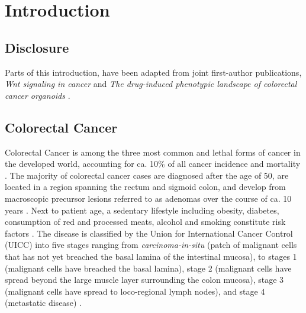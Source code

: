 \chapter{Introduction}
\label{introduction}
\begin{flushleft}
\setlength{\parindent}{7ex}
\section{Disclosure}
Parts of this introduction, have been adapted from joint first-author publications, \textit{Wnt signaling in cancer} \citep{zhanWntSignalingCancer2017} and \textit{The drug-induced phenotypic landscape of colorectal cancer organoids} \citep{betgeDruginducedPhenotypicLandscape2022}.

\section{Colorectal Cancer}
Colorectal Cancer is among the three most common and lethal forms of cancer in the developed world, accounting for ca. 10\% of all cancer incidence and mortality \citep{sungGlobalCancerStatistics2021}. The majority of colorectal cancer cases are diagnosed after the age of 50, are located in a region spanning the rectum and sigmoid colon, and develop from macroscopic precursor lesions referred to as adenomas over the course of ca. 10 years \citep{choGeneticAlterationsAdenoma1992}. Next to patient age, a sedentary lifestyle including obesity, diabetes, consumption of red and processed meats, alcohol and smoking constitute risk factors \citep{sungGlobalCancerStatistics2021}. The disease is classified by the Union for International Cancer Control (UICC) into five stages ranging from \textit{carcinoma-in-situ} (patch of malignant cells that has not yet breached the basal lamina of the intestinal mucosa), to stages 1 (malignant cells have breached the basal lamina), stage 2 (malignant cells have spread beyond the large muscle layer surrounding the colon mucosa), stage 3 (malignant cells have spread to loco-regional lymph nodes), and stage 4 (metastatic disease) \citep{vancutsemESMOConsensusGuidelines2016a}.
\par


\end{flushleft}
